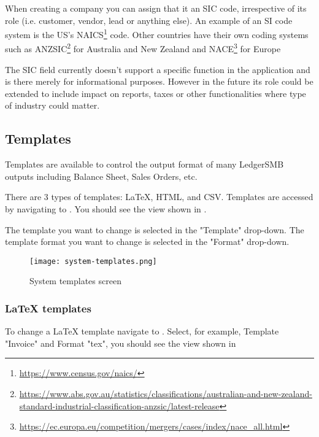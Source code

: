 When creating a company you can assign that it an SIC code, irrespective of its role (i.e. customer,
vendor, lead or anything else). An example of an SI code system is the
US's NAICS\footnote{\url{https://www.census.gov/naics/}} code.
Other countries have their own coding systems such
as ANZSIC\footnote{\url{https://www.abs.gov.au/statistics/classifications/australian-and-new-zealand-standard-industrial-classification-anzsic/latest-release}} for Australia and New Zealand
and NACE\footnote{\url{https://ec.europa.eu/competition/mergers/cases/index/nace\_all.html}} for Europe

The SIC field currently doesn't support a specific function in the application and is there
merely for informational purposes. However in the future its role could be extended to include
impact on reports, taxes or other functionalities where type of industry could matter.

\subsection {Templates}
\label{subsec-company-config-templates}

Templates are available to control the output format of many LedgerSMB outputs including Balance Sheet, Sales Orders, etc.

There are 3 types of templates: \LaTeX, HTML, and CSV.
Templates are accessed by navigating to .
You should see the view shown in .

The template you want to change is selected in the "Template" drop-down. The template format you want to change is selected in the "Format" drop-down.

\begin{figure}[h]
        \centering
        \texttt{[image: system-templates.png]}
        \caption{System templates screen}
        \label{fig:system-templates}
\end{figure}

\subsubsection{\LaTeX{} templates}
\label{subsec-company-config-latex-templates}

To change a \LaTeX{} template navigate to .
Select, for example, Template "Invoice" and Format "tex", you should see the view shown in 

